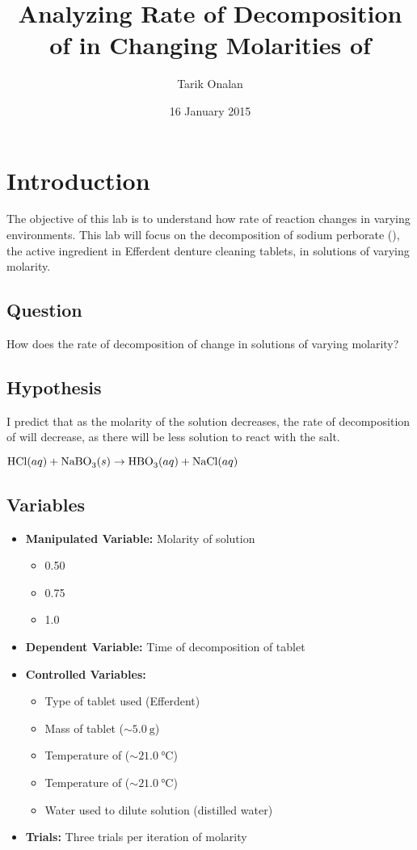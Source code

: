 \documentclass[a4paper]{article}
\title{Analyzing Rate of Decomposition of \ce{NaBO3} in Changing Molarities of \ce{HCl}}
\date{16 January 2015}
\author{Tarik Onalan}
\begin{document}
    \maketitle
    \section{Introduction}
        The objective of this lab is to understand how rate of reaction changes in
        varying environments. This lab will focus on the decomposition of sodium
        perborate (), the active ingredient in Efferdent denture cleaning
        tablets, in  solutions of varying molarity.
        \subsection{Question}
            How does the rate of decomposition of  change in  solutions
            of varying molarity?
        \subsection{Hypothesis}
            I predict that as the molarity of the  solution decreases, the
            rate of decomposition of  will decrease, as there will be less
            solution to react with the salt.
            \centerline{\(\ce{HCl}(aq)+\ce{NaBO3}(s)\to\ce{HBO3}(aq)+\ce{NaCl}(aq)\)}
        \subsection{Variables}
            \begin{itemize}
                \item \textbf{Manipulated Variable:} Molarity of  solution
                \begin{itemize}
                    \item \SI{0.50}{\Molar}
                    \item \SI{0.75}{\Molar}
                    \item \SI{1.0}{\Molar}
                \end{itemize}
                \item \textbf{Dependent Variable:} Time of decomposition of  tablet
                \item \textbf{Controlled Variables:}
                \begin{itemize}
                    \item Type of tablet used (Efferdent)
                    \item Mass of tablet (\(\sim\SI{5.0}{\g}\))
                    \item Temperature of  (\(\sim\SI{21.0}{\celsius}\))
                    \item Temperature of  (\(\sim\SI{21.0}{\celsius}\))
                    \item Water used to dilute  solution (distilled water)
                \end{itemize}
                \item \textbf{Trials:} Three trials per iteration of molarity
            \end{itemize}
\end{document}
